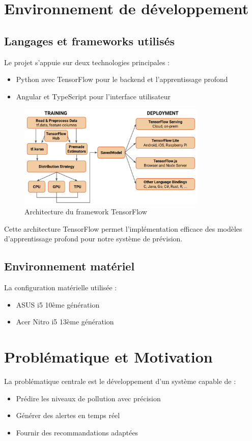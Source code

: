 \documentclass[12pt,a4paper]{report}
\begin{document}
\section{Environnement de développement}

\subsection{Langages et frameworks utilisés}
Le projet s'appuie sur deux technologies principales :
\begin{itemize}
    \item Python avec TensorFlow pour le backend et l'apprentissage profond \cite{Goodfellow2016}
    \item Angular et TypeScript pour l'interface utilisateur
\end{itemize}

\begin{figure}[h]
    \centering
    \includegraphics[width=0.8\textwidth]{tensor flow.png}  
    \caption{Architecture du framework TensorFlow}
    \label{fig:tensorflow}
\end{figure}

Cette architecture TensorFlow permet l'implémentation efficace des modèles d'apprentissage profond pour notre système de prévision.

\subsection{Environnement matériel}
La configuration matérielle utilisée :
\begin{itemize}
    \item ASUS i5 10ème génération
    \item Acer Nitro i5 13ème génération
\end{itemize}

\section{Problématique et Motivation}
La problématique centrale est le développement d'un système capable de :
\begin{itemize}
    \item Prédire les niveaux de pollution avec précision
    \item Générer des alertes en temps réel
    \item Fournir des recommandations adaptées
\end{itemize}
\end{document}
